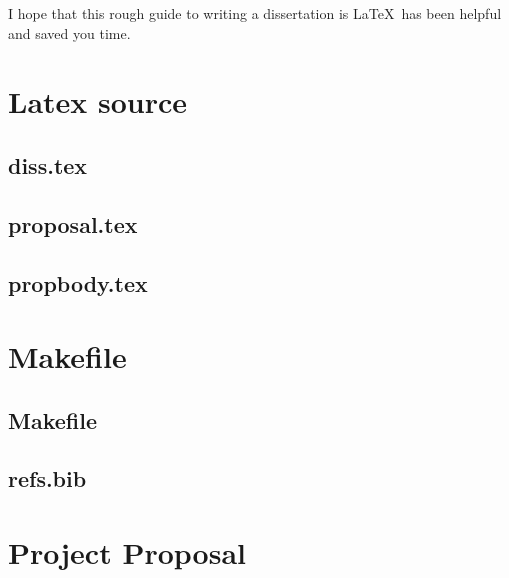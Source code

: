 \documentclass[12pt,twoside,notitlepage]{report}
\begin{document}
I hope that this rough guide to writing a dissertation is \LaTeX\ has
been helpful and saved you time.




\cleardoublepage


\nocite*{}
\cleardoublepage

\appendix

\chapter{Latex source}

\section{diss.tex}
{\scriptsize}

\section{proposal.tex}
{\scriptsize}

\section{propbody.tex}
{\scriptsize}



\cleardoublepage

\chapter{Makefile}

\section{\label{makefile}Makefile}
{\scriptsize}

\section{refs.bib}
{\scriptsize}


\cleardoublepage

\chapter{Project Proposal}


\end{document}
